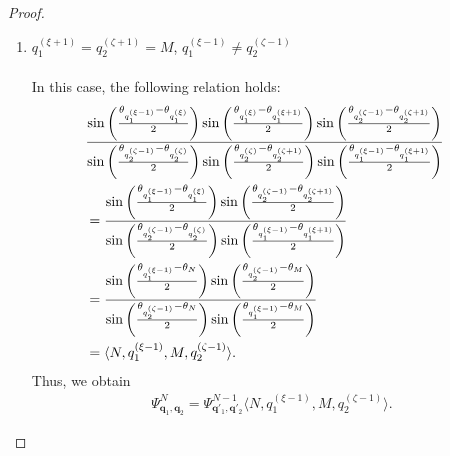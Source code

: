 \documentclass[
amsmath,amssymb,
]{revtex4-2}
\begin{document}
\begin{proof}
\begin{enumerate}
\item[\textit{Case.3:}] ${q_1^{(\xi+1)}} = {q_2^{(\zeta+1)}} = M$, ${q_1^{(\xi-1)}} \ne {q_2^{(\zeta-1)}}$\\ \\
%
In this case, the following relation holds:
\begin{align}
    &\frac{\sin\left( \frac{\theta_{q_1^{(\xi-1)}} - \theta_{q_1^{(\xi)}}}{2} \right)\sin\left( \frac{\theta_{q_1^{(\xi)}} - \theta_{q_1^{(\xi+1)}}}{2} \right)\sin\left( \frac{\theta_{q_2^{(\zeta-1)}} - \theta_{q_2^{(\zeta+1)}}}{2} \right)}
   {\sin\left( \frac{\theta_{q_2^{(\zeta-1)}} - \theta_{q_2^{(\zeta)}}}{2} \right)\sin\left( \frac{\theta_{q_2^{(\zeta)}} - \theta_{q_2^{(\zeta+1)}}}{2} \right)\sin\left( \frac{\theta_{q_1^{(\xi-1)}} - \theta_{q_1^{(\xi+1)}}}{2} \right)}\cr
    &=\frac{\sin\left( \frac{\theta_{q_1^{(\xi-1)}} - \theta_{q_1^{(\xi)}}}{2} \right)\sin\left( \frac{\theta_{q_2^{(\zeta-1)}} - \theta_{q_2^{(\zeta+1)}}}{2} \right)}
   {\sin\left( \frac{\theta_{q_2^{(\zeta-1)}} - \theta_{q_2^{(\zeta)}}}{2} \right)\sin\left( \frac{\theta_{q_1^{(\xi-1)}} - \theta_{q_1^{(\xi+1)}}}{2} \right)}\cr
    &=\frac{\sin\left( \frac{\theta_{q_1^{(\xi-1)}} - \theta_{N}}{2} \right)\sin\left( \frac{\theta_{q_2^{(\zeta-1)}} - \theta_{M}}{2} \right)}
   {\sin\left( \frac{\theta_{q_2^{(\zeta-1)}} - \theta_{N}}{2} \right)\sin\left( \frac{\theta_{q_1^{(\xi-1)}} - \theta_{M}}{2} \right)}\cr
    &= \langle N,q_1^{(\xi-1)},M, q_2^{(\zeta-1)}\rangle.
\end{align}
Thus, we obtain
\begin{align}
    \Psi^N_{\bm{q}_1, \bm{q}_2} = \Psi^{N-1}_{\bm{q}'_1, \bm{q}'_2}\langle N,q_1^{(\xi-1)},M, q_2^{(\zeta-1)}\rangle.
\end{align}


\end{enumerate}
\end{proof}
\end{document}
